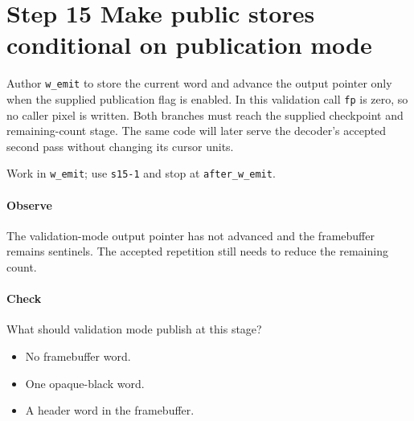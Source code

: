 \section{Step 15 Make public stores conditional on publication mode}\label{qoi-s15}
Author \texttt{w\_emit} to store the current word and advance the output pointer only when the supplied publication flag is enabled. In this validation call \texttt{fp} is zero, so no caller pixel is written. Both branches must reach the supplied checkpoint and remaining-count stage. The same code will later serve the decoder’s accepted second pass without changing its cursor units.

Work in \texttt{w\_emit}; use \texttt{s15-1} and stop at \texttt{after\_w\_emit}.

\paragraph{Observe} The validation-mode output pointer has not advanced and the framebuffer remains sentinels. The accepted repetition still needs to reduce the remaining count.

\paragraph{Check} What should validation mode publish at this stage?
\begin{itemize}
  \item[A.] No framebuffer word.
  \item[B.] One opaque-black word.
  \item[C.] A header word in the framebuffer.
\end{itemize}
